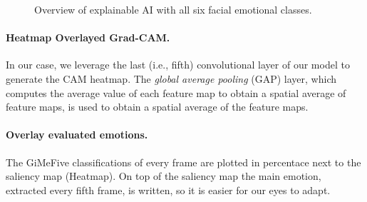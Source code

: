 \begin{figure}[ht]
  \caption{Overview of explainable AI with all six facial emotional classes.}
  \label{fig:xai}
\end{figure}

\paragraph{Heatmap Overlayed Grad-CAM.}
In our case, we leverage the last (i.e., fifth) convolutional layer of our model to generate the CAM heatmap. 
The \textit{global average pooling} (GAP) layer, 
which computes the average value of each feature map to obtain a spatial average of feature maps, 
is used to obtain a spatial average of the feature maps. 

\paragraph{Overlay evaluated emotions.} %
The GiMeFive classifications of every frame are plotted in percentace next to the saliency map (Heatmap).
On top of the saliency map the main emotion, extracted every fifth frame, is written, so it is easier for our eyes to adapt.

